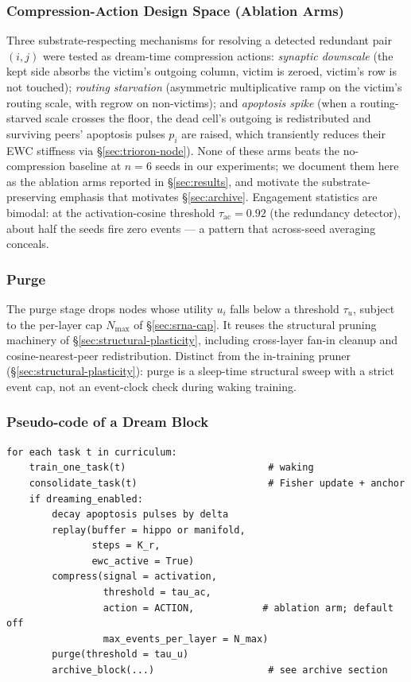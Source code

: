\documentclass[11pt]{article}
\newcommand{\ac}{\text{ac}}
\begin{document}
\subsubsection{Compression-Action Design Space (Ablation Arms)}
\label{sec:compress-arms}

Three substrate-respecting mechanisms for resolving a detected
redundant pair $(i, j)$ were tested as dream-time compression actions:
\emph{synaptic downscale} (the kept side absorbs the victim's outgoing
column, victim is zeroed, victim's row is not touched); \emph{routing
starvation} (asymmetric multiplicative ramp on the victim's routing
scale, with regrow on non-victims); and \emph{apoptosis spike} (when a
routing-starved scale crosses the floor, the dead cell's outgoing is
redistributed and surviving peers' apoptosis pulses $p_i$ are raised,
which transiently reduces their EWC stiffness via \S\ref{sec:trioron-node}).
None of these arms beats the no-compression baseline at $n = 6$ seeds
in our experiments; we document them here as the ablation arms reported
in \S\ref{sec:results}, and motivate the substrate-preserving emphasis
that motivates \S\ref{sec:archive}. Engagement statistics are bimodal:
at the activation-cosine threshold $\tau_{\ac} = 0.92$ (the redundancy
detector), about half the seeds fire zero events --- a pattern that
across-seed averaging conceals.

\subsubsection{Purge}
\label{sec:purge}

The purge stage drops nodes whose utility $u_i$ falls below a threshold
$\tau_u$, subject to the per-layer cap $N_{\max}$ of
\S\ref{sec:srna-cap}. It reuses the structural pruning machinery of
\S\ref{sec:structural-plasticity}, including cross-layer fan-in cleanup
and cosine-nearest-peer redistribution. Distinct from the in-training
pruner (\S\ref{sec:structural-plasticity}): purge is a sleep-time
structural sweep with a strict event cap, not an event-clock check
during waking training.

\subsubsection{Pseudo-code of a Dream Block}
\label{sec:dream-pseudocode}

\begin{verbatim}
for each task t in curriculum:
    train_one_task(t)                         # waking
    consolidate_task(t)                       # Fisher update + anchor
    if dreaming_enabled:
        decay apoptosis pulses by delta
        replay(buffer = hippo or manifold,
               steps = K_r,
               ewc_active = True)
        compress(signal = activation,
                 threshold = tau_ac,
                 action = ACTION,            # ablation arm; default off
                 max_events_per_layer = N_max)
        purge(threshold = tau_u)
        archive_block(...)                    # see archive section
\end{verbatim}
\end{document}
